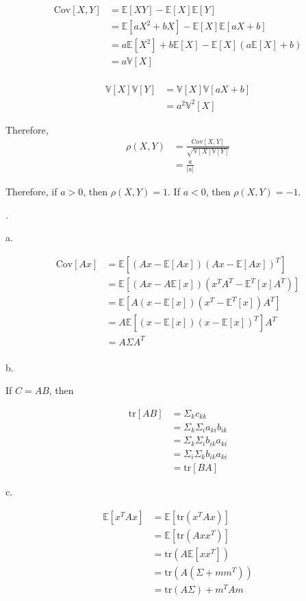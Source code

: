 \documentclass[UTF8]{article}
\begin{document}
\begin{align*}
	\text{Cov}[X, Y] &= \mathbb{E}[XY]-\mathbb{E}[X]\mathbb{E}[Y]\\
	&=\mathbb{E}[aX^2+bX] - \mathbb{E}[X]\mathbb{E}[aX+b]\\
	&=a\mathbb{E}[X^2] + b\mathbb{E}[X] - \mathbb{E}[X](a\mathbb{E}[X]+b)\\
	&= a\mathbb{V}[X]\\
\end{align*}

\begin{align*}
	\mathbb{V}[X]\mathbb{V}[Y] &= \mathbb{V}[X]\mathbb{V}[aX+b]\\
	&=a^2\mathbb{V}^2[X]
\end{align*}

Therefore, 
\begin{align*}
\rho(X, Y)&=\frac{	\text{Cov}[X, Y]}{\sqrt{\mathbb{V}[X]\mathbb{V}[Y]}}\\
&=\frac{a}{|a|}
\end{align*}

Therefore, if $a>0$, then $\rho(X, Y)=1$. If $a<0$, then $\rho(X, Y)=-1$.

.

\noindent a.

\begin{align*}
	\text{Cov}[Ax] &= \mathbb{E}[(Ax-\mathbb{E}[Ax])(Ax-\mathbb{E}[Ax])^T]\\
	&=\mathbb{E}[(Ax-A\mathbb{E}[x])(x^TA^T-\mathbb{E}^T[x]A^T)]\\
	&=\mathbb{E}[A(x-\mathbb{E}[x])(x^T-\mathbb{E}^T[x])A^T]\\
	&=A\mathbb{E}[(x-\mathbb{E}[x])(x-\mathbb{E}[x])^T]A^T\\
	&=A\Sigma A^T\\
\end{align*}

\noindent b.

If $C=AB$, then

\begin{align*}
	\text{tr}[AB] &= \Sigma_k c_{kk}\\
	&=\Sigma_k\Sigma_i a_{ki}b_{ik}\\
	& = \Sigma_k\Sigma_i b_{ik}a_{ki}\\
	& = \Sigma_i\Sigma_k b_{ik}a_{ki}\\
	& = \text{tr}[BA]
\end{align*}

\noindent c.

\begin{align*}
\mathbb{E}[x^TAx] &= \mathbb{E}[\text{tr}(x^TAx)]\\
&= \mathbb{E}[\text{tr}(Axx^T)]\\
&= \text{tr}(A\mathbb{E}[xx^T])\\
&= \text{tr}(A(\Sigma+mm^T))\\
&= \text{tr}(A\Sigma)+m^TAm\\
\end{align*}
\end{document}

